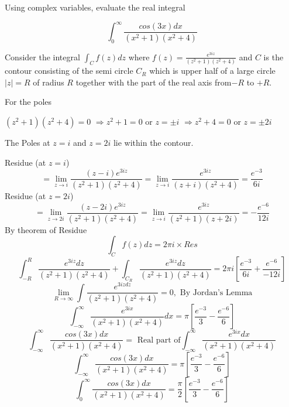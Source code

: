 \begin{example}
Using complex variables, evaluate the real integral

\[
\int_{0}^{\infty}\frac{cos(3x)dx}{(x^{2}+1)(x^{2}+4)}\]

\end{example}
\begin{solution}
Consider the integral $\int_{C}f(z)dz$ where $f(z)=\frac{e^{3iz}}{(z^{2}+1)(z^{2}+4)}$
and $C$ is the contour consisting of the semi circle $C_{R}$ which
is upper half of a large circle $|z|=R$ of radius $R$ together with
the part of the real axis from$-R$ to $+R$. 

For the poles 
\begin{center}
$(z^{2}+1)(z^{2}+4)=0$ $\Rightarrow z^{2}+1=0$ or $z=\pm i$  $\Rightarrow z^{2}+4=0$ or $z=\pm2i$
\end{center}
The Poles at $z=i$ and $z=2i$ lie within the contour.

Residue (at $z=i$)\[=\lim_{z\rightarrow i}\frac{(z-i)e^{3iz}}{(z^{2}+1)(z^{2}+4)}=\lim_{z\rightarrow i}\frac{e^{3iz}}{(z+i)(z^{2}+4)}=\frac{e^{-3}}{6i}\]
Residue (at $z=2i$)\[=\lim_{z\rightarrow2i}\frac{(z-2i)e^{3iz}}{(z^{2}+1)(z^{2}+4)}=\lim_{z\rightarrow i}\frac{e^{3iz}}{(z^{2}+1)(z+2i)}=-\frac{e^{-6}}{12i}\]
By theorem of Residue \[\int_{C}f(z)dz=2\pi i\times Res\]
\[\int_{-R}^{R}\frac{e^{3iz}dz}{(z^{2}+1)(z^{2}+4)}+\int_{C_{R}}\frac{e^{3iz}dz}{(z^{2}+1)(z^{2}+4)}=2\pi i\left[\frac{e^{-3}}{6i}+\frac{e^{-6}}{-12i}\right]\]
\[\lim_{R\rightarrow\infty}\int\frac{e^{3izdz}}{(z^{2}+1)(z^{2}+4)}=0,\text{ By Jordan's Lemma}\]
\[\int_{-\infty}^{\infty}\frac{e^{3ix}}{(x^{2}+1)(x^{2}+4)}dx=\pi\left[\frac{e^{-3}}{3}-\frac{e^{-6}}{6}\right]\]
\[\int_{-\infty}^{\infty}\frac{cos(3x)dx}{(x^{2}+1)(x^{2}+4)}=\text{ Real part of}\int_{-\infty}^{\infty}\frac{e^{3ix}dx}{(x^{2}+1)(x^{2}+4)}\]
\[\int_{-\infty}^{\infty}\frac{cos(3x)dx}{(x^{2}+1)(x^{2}+4)}=\pi\left[\frac{e^{-3}}{3}-\frac{e^{-6}}{6}\right]\]
\[\int_{0}^{\infty}\frac{cos(3x)dx}{(x^{2}+1)(x^{2}+4)}=\frac{\pi}{2}\left[\frac{e^{-3}}{3}-\frac{e^{-6}}{6}\right]\]
\end{solution}

